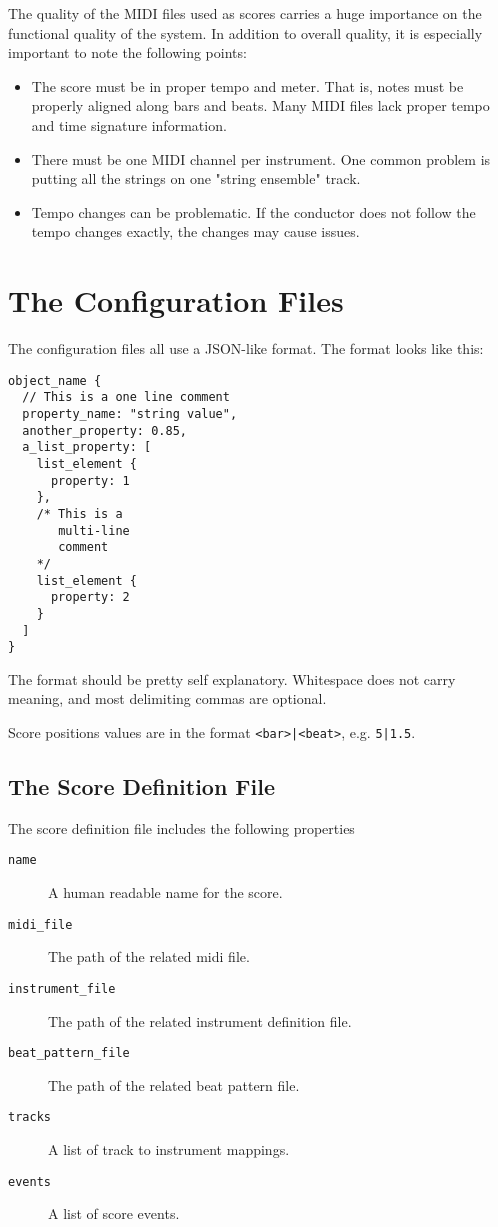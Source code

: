 \documentclass[12pt,a4paper]{article}
\begin{document}
The quality of the MIDI files used as scores carries
a huge importance on the functional quality of the system.
In addition to overall quality,
it is especially important to note the following points:
\begin{itemize}
\item The score must be in proper tempo and meter.
That is, notes must be properly aligned along bars and beats.
Many MIDI files lack proper tempo and time signature information.
\item There must be one MIDI channel per instrument.
One common problem is putting all the strings on one "string ensemble" track.
\item Tempo changes can be problematic.
If the conductor does not follow the tempo changes exactly,
the changes may cause issues.
\end{itemize}

\section{The Configuration Files}

The configuration files all use a JSON-like format.
The format looks like this:
\begin{verbatim}
object_name {
  // This is a one line comment
  property_name: "string value",
  another_property: 0.85,
  a_list_property: [
  	list_element {
  	  property: 1
  	},
  	/* This is a
  	   multi-line
  	   comment
  	*/
  	list_element {
  	  property: 2
  	}
  ]
}
\end{verbatim}
The format should be pretty self explanatory.
Whitespace does not carry meaning,
and most delimiting commas are optional.

Score positions values are in the format \texttt{<bar>|<beat>},
e.g. \texttt{5|1.5}.

\subsection{The Score Definition File}
\label{sec:score_definition_files}

The score definition file includes the following properties
\begin{description}
\item[\texttt{name}] A human readable name for the score.
\item[\texttt{midi\_file}] The path of the related midi file.
\item[\texttt{instrument\_file}] The path of the related instrument definition file.
\item[\texttt{beat\_pattern\_file}] The path of the related beat pattern file.
\item[\texttt{tracks}] A list of track to instrument mappings.
\item[\texttt{events}] A list of score events.
\end{description}
\end{document}
